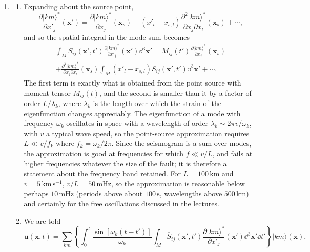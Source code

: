 \documentclass[a4paper,10pt]{paper}
\begin{document}
\begin{enumerate}
 \item
\begin{enumerate}
\item Expanding about the source point,
\begin{equation*}
    \frac{\partial|km\rangle^{*}}{\partial x'_{j}}(\mathbf{x}')=\frac{\partial|km\rangle^{*}}{\partial x_{j}}(\mathbf{x}_{s})
    +(x'_{l}-x_{s,l})\frac{\partial^{2}|km\rangle^{*}}{\partial x_{j}\partial x_{l}}(\mathbf{x}_{s})+\cdots,
\end{equation*}
and so the spatial integral in the mode sum becomes
\begin{multline*}
    \int_{M}\overline{S}_{ij}(\mathbf{x}',t')\frac{\partial|km\rangle^{*}}{\partial x'_{j}}(\mathbf{x}')\dd^{3}\mathbf{x}'
    =M_{ij}(t')\frac{\partial|km\rangle^{*}}{\partial x_{j}}(\mathbf{x}_{s}) \\
    +\frac{\partial^{2}|km\rangle^{*}}{\partial x_{j}\partial x_{l}}(\mathbf{x}_{s})
    \int_{M}(x'_{l}-x_{s,l})\overline{S}_{ij}(\mathbf{x}',t')\dd^{3}\mathbf{x}'+\cdots.
\end{multline*}
The first term is exactly what is obtained from the point source with moment tensor $M_{ij}(t)$, and the second is smaller than it by a 
factor of order $L/\lambda_{k}$, where $\lambda_{k}$ is the length over which the strain of the eigenfunction changes appreciably. 
The eigenfunction of a mode with frequency $\omega_{k}$ oscillates in space with a wavelength of order $\lambda_{k}\sim2\pi v/\omega_{k}$, with $v$ 
a typical wave speed, so the point-source approximation requires $L\ll v/f_{k}$ where $f_{k}=\omega_{k}/2\pi$. Since the seismogram is a sum 
over modes, the approximation is good at frequencies for which $f\ll v/L$, and fails at higher frequencies whatever the size of the 
fault; it is therefore a statement about the frequency band retained. For $L=100\,\mathrm{km}$ and $v=5\,\mathrm{km\,s^{-1}}$, 
$v/L=50\,\mathrm{mHz}$, so the approximation is reasonable below perhaps $10\,\mathrm{mHz}$ (periods above about $100\,\mathrm{s}$, 
wavelengths above $500\,\mathrm{km}$) and certainly for the free oscillations discussed in the lectures.
\item We are told
\begin{equation*}
    \mathbf{u}(\mathbf{x},t) = \sum_{km}\left\{\int_{0}^{t}\frac{\sin[\omega_{k}(t-t')]}{\omega_{k}}\int_{M}\overline{S}_{ij}(\mathbf{x}',t')\frac{\partial|km\rangle^{*}}{\partial x'_{j}}(\mathbf{x}')\dd^{3}\mathbf{x}'\dd t'\right\}|km\rangle(\mathbf{x}),
\end{equation*}

\end{enumerate}
\end{enumerate}
\end{document}

